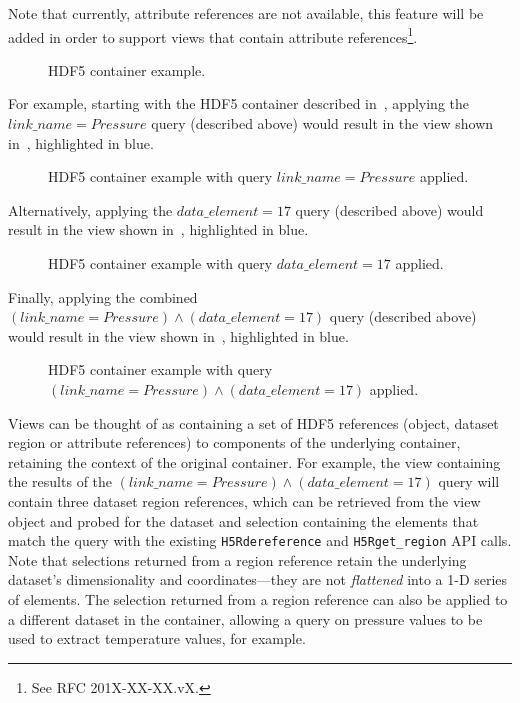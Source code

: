 \documentclass[letterpaper,hyper]{THG_RFC}
\begin{document}
 Note that currently,
attribute references are not available, this feature will be added in order to
support views that contain attribute references\footnote{See RFC 201X-XX-XX.vX.}.

\begin{figure}

\caption{HDF5 container example.}
\label{fig:hdf5_view1}
\end{figure}

For example, starting with the HDF5 container described in~,
applying the $link\_name = Pressure$ query (described above) would result
in the view shown in~, highlighted in blue.

\begin{figure}

\caption{HDF5 container example with query $link\_name = Pressure$ applied.}
\label{fig:hdf5_view2}
\end{figure}

Alternatively, applying the $data\_element = 17$ query (described above) would
result in the view shown in~, highlighted in blue.

\begin{figure}

\caption{HDF5 container example with query $data\_element = 17$ applied.}
\label{fig:hdf5_view3}
\end{figure}

Finally, applying the combined $(link\_name = Pressure)\land(data\_element = 17)$
query (described above) would result in the view shown in~,
highlighted in blue.

\begin{figure}

\caption{HDF5 container example with query $(link\_name = Pressure)\land(data\_element = 17)$ applied.}
\label{fig:hdf5_view4}
\end{figure}

Views can be thought of as containing a set of HDF5 references (object,
dataset region or attribute references) to components of the underlying
container, retaining the context of the original container. For example, the
view containing the results of the $(link\_name = Pressure)\land(data\_element = 17)$
query will contain three dataset region references, which
can be retrieved from the view object and probed for the dataset and selection
containing the elements that match the query with the existing \texttt{H5Rdereference}
and \texttt{H5Rget\_region} API calls. Note that selections returned from a region
reference retain the underlying dataset's dimensionality and coordinates---they
are not \textit{flattened} into a 1-D series of elements. The selection returned
from a region reference can also be applied to a different dataset in the container,
allowing a query on pressure values to be used to extract temperature values,
for example.
\end{document}
